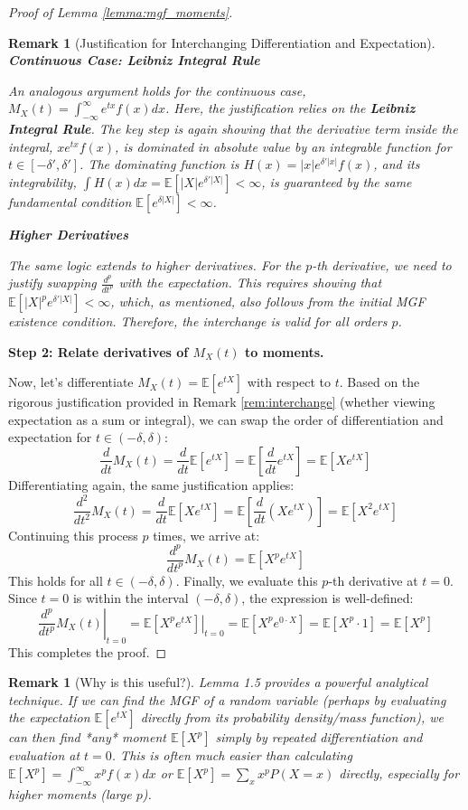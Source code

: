 \documentclass[12pt]{article}
\newtheorem{remark}[theorem]{Remark}
\begin{document}
\begin{proof}[Proof of Lemma \ref{lemma:mgf_moments}]
\begin{remark}[Justification for Interchanging Differentiation and Expectation]
\textbf{Continuous Case: Leibniz Integral Rule}

An analogous argument holds for the continuous case, $M_X(t) = \int_{-\infty}^{\infty} e^{tx} f(x) dx$. Here, the justification relies on the \textbf{Leibniz Integral Rule}. The key step is again showing that the derivative term inside the integral, $x e^{tx} f(x)$, is dominated in absolute value by an integrable function for $t \in [-\delta', \delta']$. The dominating function is $H(x) = |x| e^{\delta'|x|} f(x)$, and its integrability, $\int H(x) dx = \mathbb{E}[|X| e^{\delta'|X|}] < \infty$, is guaranteed by the same fundamental condition $\mathbb{E}[e^{\delta|X|}] < \infty$.

\textbf{Higher Derivatives}

The same logic extends to higher derivatives. For the $p$-th derivative, we need to justify swapping $\frac{d^p}{dt^p}$ with the expectation. This requires showing that $\mathbb{E}[|X|^p e^{\delta'|X|}] < \infty$, which, as mentioned, also follows from the initial MGF existence condition. Therefore, the interchange is valid for all orders $p$.
\end{remark}

\textbf{Step 2: Relate derivatives of $M_X(t)$ to moments.}

Now, let's differentiate $M_X(t) = \mathbb{E}[e^{tX}]$ with respect to $t$. Based on the rigorous justification provided in Remark \ref{rem:interchange} (whether viewing expectation as a sum or integral), we can swap the order of differentiation and expectation for $t \in (-\delta, \delta)$:
\[
\frac{d}{dt} M_X(t) = \frac{d}{dt} \mathbb{E}[e^{tX}] = \mathbb{E}\left[ \frac{d}{dt} e^{tX} \right] = \mathbb{E}[X e^{tX}]
\]
Differentiating again, the same justification applies:
\[
\frac{d^2}{dt^2} M_X(t) = \frac{d}{dt} \mathbb{E}[X e^{tX}] = \mathbb{E}\left[ \frac{d}{dt} (X e^{tX}) \right] = \mathbb{E}[X^2 e^{tX}]
\]
Continuing this process $p$ times, we arrive at:
\[
\frac{d^p}{dt^p} M_X(t) = \mathbb{E}[X^p e^{tX}]
\]
This holds for all $t \in (-\delta, \delta)$. Finally, we evaluate this $p$-th derivative at $t=0$. Since $t=0$ is within the interval $(-\delta, \delta)$, the expression is well-defined:
\[
\left. \frac{d^p}{dt^p} M_X(t) \right|_{t=0} = \left. \mathbb{E}[X^p e^{tX}] \right|_{t=0} = \mathbb{E}[X^p e^{0 \cdot X}] = \mathbb{E}[X^p \cdot 1] = \mathbb{E}[X^p]
\]
This completes the proof.
\end{proof}

\begin{remark}[Why is this useful?] %
Lemma 1.5 provides a powerful analytical technique. If we can find the MGF of a random variable (perhaps by evaluating the expectation $\mathbb{E}[e^{tX}]$ directly from its probability density/mass function), we can then find *any* moment $\mathbb{E}[X^p]$ simply by repeated differentiation and evaluation at $t=0$. This is often much easier than calculating $\mathbb{E}[X^p] = \int_{-\infty}^{\infty} x^p f(x) dx$ or $\mathbb{E}[X^p] = \sum_x x^p P(X=x)$ directly, especially for higher moments (large $p$).
\end{remark}
\end{document}
